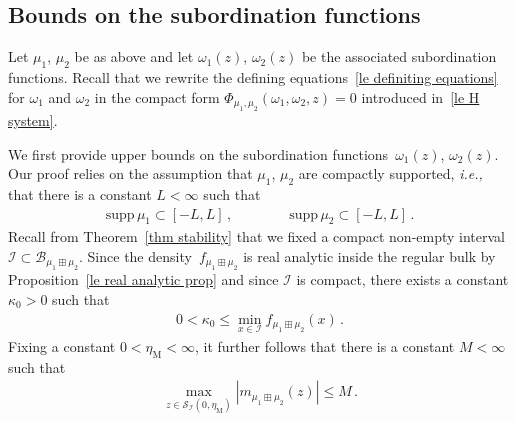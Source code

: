 \documentclass[10pt,reqno]{amsart}
\numberwithin{equation}{section}
\theoremstyle{plain}
\numberwithin{kevin}{section}
\theoremstyle{remark}
\newcommand{\ie}{\emph{i.e., }}
\newcommand{\PP}{\Phi}
\begin{document}
\subsection{Bounds on the subordination functions}
Let $\mu_1$, $\mu_2$ be as above and let $\omega_1(z)$, $\omega_2(z)$ be the associated subordination functions. Recall that we rewrite the defining equations~\eqref{le definiting equations} for $\omega_1$ and $\omega_2$ in the compact form $\PP_{\mu_1,\mu_2}(\omega_1,\omega_2,z)=0$ introduced in~\eqref{le H system}.

We first provide upper bounds on the subordination functions~$\omega_1(z)$, $\omega_2(z)$. Our proof relies on the assumption that $\mu_1$, $\mu_2$ are compactly supported, \ie that there is a constant $L<\infty$ such that
\begin{align}\label{le compact support assumption}
 \mathrm{supp}\,\mu_1\subset [-L,L]\,,\qquad \qquad\mathrm{supp}\,\mu_2\subset[-L,L]\,.
 \end{align}
Recall from Theorem~\ref{thm stability} that we fixed a compact non-empty interval $\mathcal{I}\subset\mathcal{B}_{\mu_1\boxplus\mu_2}$. Since the density~$f_{\mu_1\boxplus\mu_2}$ is real analytic inside the regular bulk by Proposition~\ref{le real analytic prop} and since $\mathcal{I}$ is compact, there exists a constant $\kappa_0>0$ such that
 \begin{align}\label{assumption lower bound on density}
 0<\kappa_0\le\min_{x\in \mathcal{I}}f_{\mu_{1}\boxplus\mu_{2}}(x)\,.
\end{align}
Fixing a constant $0<\eta_{\mathrm{M}}<\infty$, it further follows that there is a constant $M<\infty$ such that
\begin{align}\label{assumption bounded m}
 \max_{z\in\mathcal{S}_{\mathcal{I}}(0,\eta_{\mathrm{M}})} |m_{\mu_{1}\boxplus\mu_{2}}(z)|\le M\,.
\end{align}
\end{document}

